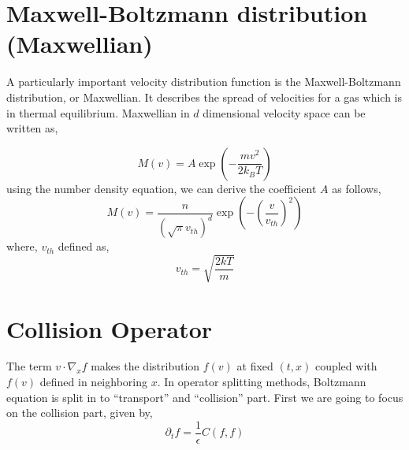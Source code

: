 \documentclass{article}
\begin{document}
\section{Maxwell-Boltzmann distribution (Maxwellian)}
\label{sec:maxwellian}
A particularly important velocity distribution function is the Maxwell-Boltzmann distribution, or Maxwellian. It describes the spread of velocities for a gas which is in thermal equilibrium. Maxwellian in $d$ dimensional velocity space can be written as,

\begin{equation}
    M(v) = A \exp(-\frac{mv^2}{2k_BT})
\end{equation}
using the number density equation, we can derive the coefficient $A$ as follows, 
\begin{equation}
M(v) = \frac{n}{(\sqrt{\pi}v_{th})^d} \exp{(-(\frac{v}{v_{th}})^2)}    
\end{equation} where, $v_{th}$ defined as, 
\begin{equation}
    v_{th} = \sqrt{\frac{2kT}{m}}
\end{equation}




\section{Collision Operator}
\label{sec:collision_operator}
The term $v\cdot \nabla_x f$ makes the distribution $f(v)$ at fixed $(t,x)$ coupled with $f(v)$ defined in neighboring $x$. In operator splitting methods, Boltzmann equation is split in to ``transport'' and ``collision'' part. First we are going to focus on the collision part, given by, 
\begin{equation}
    \partial_t f = \frac{1}{\epsilon}C(f,f) \label{eq:col_op}
\end{equation}

\end{document}
